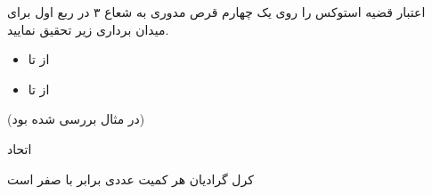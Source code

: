 
\begin{ELexample}{}

اعتبار قضیه استوکس را روی یک چهارم قرص مدوری به شعاع ۳ در ربع اول برای میدان برداری زیر تحقیق نمایید.


\begin{ELsolution}


\begin{itemize}
\tightlist
\item
  از  تا 
\end{itemize}


\begin{itemize}
\tightlist
\item
  از  تا 
\end{itemize}



(در مثال  بررسی شده بود)

\end{ELsolution}

\end{ELexample}

\ELhold


\begin{ELimportant}{اتحاد }

کرل گرادیان هر کمیت عددی برابر با صفر است

\end{ELimportant}

